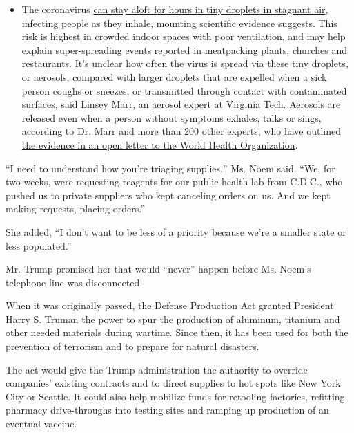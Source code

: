 \begin{itemize}
  \begin{itemize}
  \tightlist
  \item
    The coronavirus
    \href{https://www.nytimes.com/2020/07/04/health/239-experts-with-one-big-claim-the-coronavirus-is-airborne.html?action=click\&pgtype=Article\&state=default\&region=MAIN_CONTENT_3\&context=storylines_faq}{can
    stay aloft for hours in tiny droplets in stagnant air}, infecting
    people as they inhale, mounting scientific evidence suggests. This
    risk is highest in crowded indoor spaces with poor ventilation, and
    may help explain super-spreading events reported in meatpacking
    plants, churches and restaurants.
    \href{https://www.nytimes.com/2020/07/06/health/coronavirus-airborne-aerosols.html?action=click\&pgtype=Article\&state=default\&region=MAIN_CONTENT_3\&context=storylines_faq}{It's
    unclear how often the virus is spread} via these tiny droplets, or
    aerosols, compared with larger droplets that are expelled when a
    sick person coughs or sneezes, or transmitted through contact with
    contaminated surfaces, said Linsey Marr, an aerosol expert at
    Virginia Tech. Aerosols are released even when a person without
    symptoms exhales, talks or sings, according to Dr. Marr and more
    than 200 other experts, who
    \href{https://academic.oup.com/cid/article/doi/10.1093/cid/ciaa939/5867798}{have
    outlined the evidence in an open letter to the World Health
    Organization}.
  \end{itemize}
\end{itemize}

``I need to understand how you're triaging supplies,'' Ms. Noem said.
``We, for two weeks, were requesting reagents for our public health lab
from C.D.C., who pushed us to private suppliers who kept canceling
orders on us. And we kept making requests, placing orders.''

She added, ``I don't want to be less of a priority because we're a
smaller state or less populated.''

Mr. Trump promised her that would ``never'' happen before Ms. Noem's
telephone line was disconnected.

When it was originally passed, the Defense Production Act granted
President Harry S. Truman the power to spur the production of aluminum,
titanium and other needed materials during wartime. Since then, it has
been used for both the prevention of terrorism and to prepare for
natural disasters.

The act would give the Trump administration the authority to override
companies' existing contracts and to direct supplies to hot spots like
New York City or Seattle. It could also help mobilize funds for
retooling factories, refitting pharmacy drive-throughs into testing
sites and ramping up production of an eventual vaccine.

